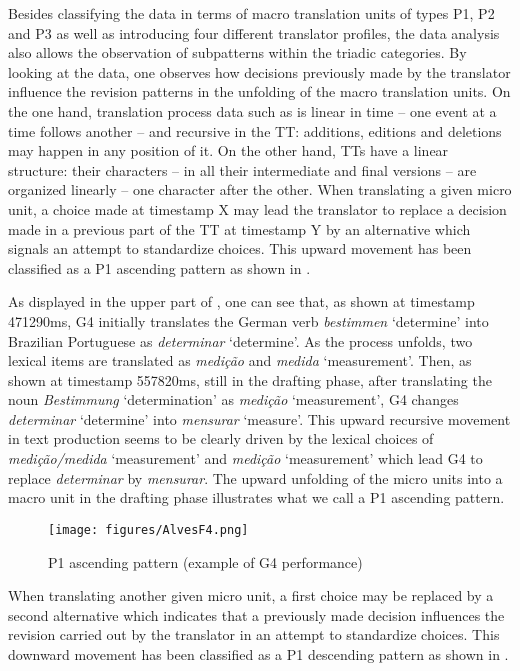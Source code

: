 \documentclass[output=paper]{LSP/langsci}
\begin{document}
 
Besides classifying the data in terms of macro translation units of types P1, P2 and P3 as well as introducing four different translator profiles, the data analysis also allows the observation of subpatterns within the triadic categories. By looking at the data, one observes how decisions previously made by the translator influence the revision patterns in the unfolding of the macro translation units. On the one hand, translation process data such as  is linear in time -- one event at a time follows another -- and recursive in the TT: additions, editions and deletions may happen in any position of it. On the other hand, TTs have a linear structure: their characters -- in all their intermediate and final versions -- are organized linearly -- one character after the other. When translating a given micro unit, a choice made at timestamp X may lead the translator to replace a decision made in a previous part of the TT at timestamp Y by an alternative which signals an attempt to standardize choices. This upward movement has been classified as a P1 ascending pattern as shown in .

As displayed in the upper part of , one can see that, as shown at timestamp 471290ms, G4 initially translates the German verb \textit{bestimmen} `determine' into Brazilian Portuguese as \textit{determinar} `determine'. As the process unfolds, two lexical items are translated as \textit{medição} and \textit{medida} `measurement'. Then, as shown at timestamp 557820ms, still in the drafting phase, after translating the noun \textit{Bestimmung} `determination' as \textit{medição} `measurement', G4 changes \textit{determinar} `determine' into \textit{mensurar} `measure'. This upward recursive movement in text production seems to be clearly driven by the lexical choices of \textit{medição/medida} `measurement' and \textit{medição} `measurement' which lead G4 to replace \textit{determinar} by \textit{mensurar}. The upward unfolding of the micro units into a macro unit in the drafting phase illustrates what we call a P1 ascending pattern. 

  
\begin{figure}
\texttt{[image: figures/AlvesF4.png]}
\caption{P1 ascending pattern (example of G4 performance)}
\label{fig:alves:4}
\end{figure} 

When translating another given micro unit, a first choice may be replaced by a second alternative which indicates that a previously made decision influences the revision carried out by the translator in an attempt to standardize choices. This downward movement has been classified as a P1 descending pattern as shown in . 
\end{document}
